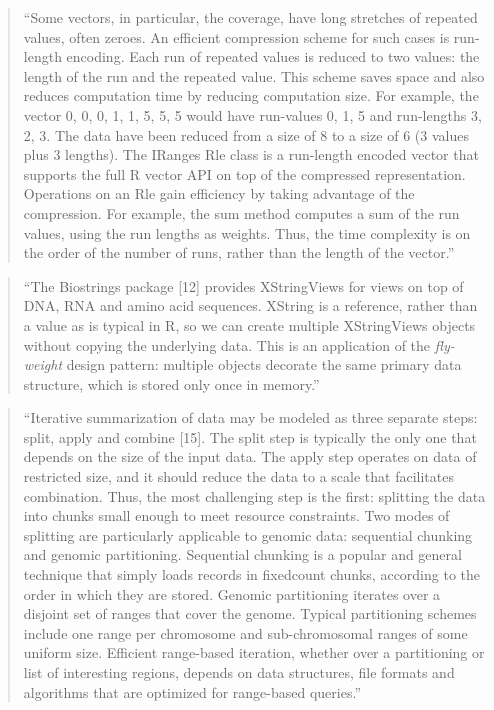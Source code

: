 \documentclass[]{tufte-book}
\begin{document}
\begin{quote}
``Some vectors, in particular, the coverage, have long stretches of repeated
values, often zeroes. An efficient compression scheme for such cases is
run-length encoding. Each run of repeated values is reduced to two values: the
length of the run and the repeated value. This scheme saves space and also
reduces computation time by reducing computation size. For example, the vector
0, 0, 0, 1, 1, 5, 5, 5 would have run-values 0, 1, 5 and run-lengths 3, 2, 3.
The data have been reduced from a size of 8 to a size of 6 (3 values plus 3
lengths). The IRanges Rle class is a run-length encoded vector that supports the
full R vector API on top of the compressed representation. Operations on an Rle
gain efficiency by taking advantage of the compression. For example, the sum
method computes a sum of the run values, using the run lengths as weights. Thus,
the time complexity is on the order of the number of runs, rather than the
length of the vector.'' \citep{lawrence2014scalable}
\end{quote}

\begin{quote}
``The Biostrings package {[}12{]} provides XStringViews for views on top of DNA,
RNA and amino acid sequences. XString is a reference, rather than a value as is
typical in R, so we can create multiple XStringViews objects without copying the
underlying data. This is an application of the \emph{fly-weight} design pattern:
multiple objects decorate the same primary data structure, which is stored only
once in memory.'' \citep{lawrence2014scalable}
\end{quote}

\begin{quote}
``Iterative summarization of data may be modeled as three separate steps:
split, apply and combine {[}15{]}. The split step is typically the only one that
depends on the size of the input data. The apply step operates on data of
restricted size, and it should reduce the data to a scale that facilitates
combination. Thus, the most challenging step is the first: splitting the data
into chunks small enough to meet resource constraints. Two modes of splitting
are particularly applicable to genomic data: sequential chunking and genomic
partitioning. Sequential chunking is a popular and general technique that simply
loads records in fixedcount chunks, according to the order in which they are
stored. Genomic partitioning iterates over a disjoint set of ranges that cover
the genome. Typical partitioning schemes include one range per chromosome and
sub-chromosomal ranges of some uniform size. Efficient range-based iteration,
whether over a partitioning or list of interesting regions, depends on data
structures, file formats and algorithms that are optimized for range-based
queries.'' \citep{lawrence2014scalable}
\end{quote}
\end{document}
